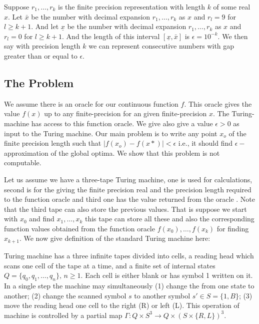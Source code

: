 	\begin{remark}\label{gaprem}
		Suppose $r_1,\ldots,r_k$ is the finite precision representation with length $k$ of some real $x$. Let $\bar x$ be the number with decimal expansion $r_1,\ldots,r_k$ as $x$ and $r_{l}=9$ for $l \geq k+1$. And let $\underline x$ be the number with decimal expansion $r_1,\ldots,r_k$ as $x$ and $r_{l}=0$ for $l \geq k+1$. %
		And the length of this interval $[\underline x,\bar x]$ is $\epsilon = 10^{-k}$. We then say with precision length $k$ we can represent consecutive numbers with gap greater than or equal to $\epsilon$.
	\end{remark}
	
	\subsection{The Problem}
	We assume there is an oracle for our continuous function $f$. This oracle gives the value $f(x)$ up to any finite-precision for an given finite-precision $x$. The Turing-machine has access to this function oracle. We give also give a value $\epsilon > 0$ as input to the Turing machine. Our main problem is to write any point $x_{o}$ of the finite precision length such that $|f(x_{o})-f(x*)| < \epsilon$ i.e., it should find $\epsilon-$ approximation of the global optima. We show that this problem is not computable.
	
	Let us assume we have a three-tape Turing machine, one is used for calculations, second is for the giving the finite precision real and the precision length required to the function oracle and third one has the value returned from the oracle \cite{sorbook}. Note that the third tape can also store the previous values. That is suppose we start with $x_0$ and find $x_1,\ldots,x_{k}$ this tape can store all these and also the corresponding function values obtained from the function oracle $f(x_0),\ldots,f(x_k)$ for finding $x_{k+1}$. We now give definition of the standard Turing machine here:
	
	\begin{definition}
		Turing machine has a three infinite tapes divided into cells, a reading head which scans one cell of the tape at a time, and a finite set of internal states $Q=\{q_0,q_1,\ldots,q_n\}, \, n \geq 1$. Each cell is either blank or has symbol 1 written on it. In a single step the machine may simultaneously (1) change the from one state to another; (2) change the scanned symbol $s$ to another symbol $s'\in S = \{1,B\}$; (3) move the reading head one cell to the right (R) or left (L). This operation of machine is controlled by a partial map $\Gamma : Q \times S^3 \rightarrow Q \times (S \times \{R,L\})^3$.
	\end{definition}
	
